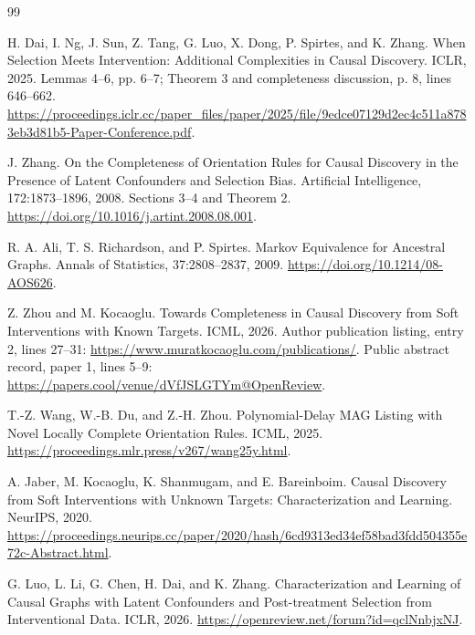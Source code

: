 \documentclass{article}
\begin{document}
\begin{thebibliography}{99}

   H. Dai, I. Ng, J. Sun, Z. Tang, G. Luo, X. Dong, P. Spirtes, and K. Zhang. When Selection Meets Intervention: Additional Complexities in Causal Discovery. ICLR, 2025. Lemmas 4--6, pp. 6--7; Theorem 3 and completeness discussion, p. 8, lines 646--662. \url{https://proceedings.iclr.cc/paper\_files/paper/2025/file/9edce07129d2ec4c511a8783eb3d81b5-Paper-Conference.pdf}.

   J. Zhang. On the Completeness of Orientation Rules for Causal Discovery in the Presence of Latent Confounders and Selection Bias. Artificial Intelligence, 172:1873--1896, 2008. Sections 3--4 and Theorem 2. \url{https://doi.org/10.1016/j.artint.2008.08.001}.

   R. A. Ali, T. S. Richardson, and P. Spirtes. Markov Equivalence for Ancestral Graphs. Annals of Statistics, 37:2808--2837, 2009. \url{https://doi.org/10.1214/08-AOS626}.

   Z. Zhou and M. Kocaoglu. Towards Completeness in Causal Discovery from Soft Interventions with Known Targets. ICML, 2026. Author publication listing, entry 2, lines 27--31: \url{https://www.muratkocaoglu.com/publications/}. Public abstract record, paper 1, lines 5--9: \url{https://papers.cool/venue/dVfJSLGTYm@OpenReview}.

   T.-Z. Wang, W.-B. Du, and Z.-H. Zhou. Polynomial-Delay MAG Listing with Novel Locally Complete Orientation Rules. ICML, 2025. \url{https://proceedings.mlr.press/v267/wang25y.html}.

   A. Jaber, M. Kocaoglu, K. Shanmugam, and E. Bareinboim. Causal Discovery from Soft Interventions with Unknown Targets: Characterization and Learning. NeurIPS, 2020. \url{https://proceedings.neurips.cc/paper/2020/hash/6cd9313ed34ef58bad3fdd504355e72c-Abstract.html}.

   G. Luo, L. Li, G. Chen, H. Dai, and K. Zhang. Characterization and Learning of Causal Graphs with Latent Confounders and Post-treatment Selection from Interventional Data. ICLR, 2026. \url{https://openreview.net/forum?id=qclNnbjxNJ}.

\end{thebibliography}
\end{document}
